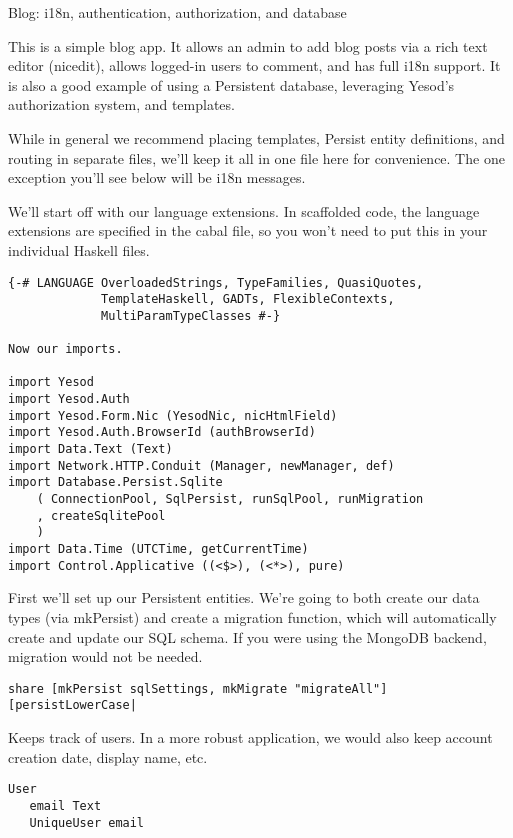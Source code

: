 Blog: i18n, authentication, authorization, and database

This is a simple blog app. It allows an admin to add blog posts via a rich text editor (nicedit), allows logged-in users to comment, and has full i18n support. It is also a good example of using a Persistent database, leveraging Yesod's authorization system, and templates.

While in general we recommend placing templates, Persist entity definitions, and routing in separate files, we'll keep it all in one file here for convenience. The one exception you'll see below will be i18n messages.

We'll start off with our language extensions. In scaffolded code, the language extensions are specified in the cabal file, so you won't need to put this in your individual Haskell files.

\begin{lstlisting}
{-# LANGUAGE OverloadedStrings, TypeFamilies, QuasiQuotes,
             TemplateHaskell, GADTs, FlexibleContexts,
             MultiParamTypeClasses #-}

Now our imports.

import Yesod
import Yesod.Auth
import Yesod.Form.Nic (YesodNic, nicHtmlField)
import Yesod.Auth.BrowserId (authBrowserId)
import Data.Text (Text)
import Network.HTTP.Conduit (Manager, newManager, def)
import Database.Persist.Sqlite
    ( ConnectionPool, SqlPersist, runSqlPool, runMigration
    , createSqlitePool
    )
import Data.Time (UTCTime, getCurrentTime)
import Control.Applicative ((<$>), (<*>), pure)
\end{lstlisting}

First we'll set up our Persistent entities. We're going to both create our data types (via mkPersist) and create a migration function, which will automatically create and update our SQL schema. If you were using the MongoDB backend, migration would not be needed.

\begin{lstlisting}
share [mkPersist sqlSettings, mkMigrate "migrateAll"] [persistLowerCase|
\end{lstlisting}

Keeps track of users. In a more robust application, we would also keep account creation date, display name, etc.

\begin{lstlisting}
User
   email Text
   UniqueUser email
\end{lstlisting}

